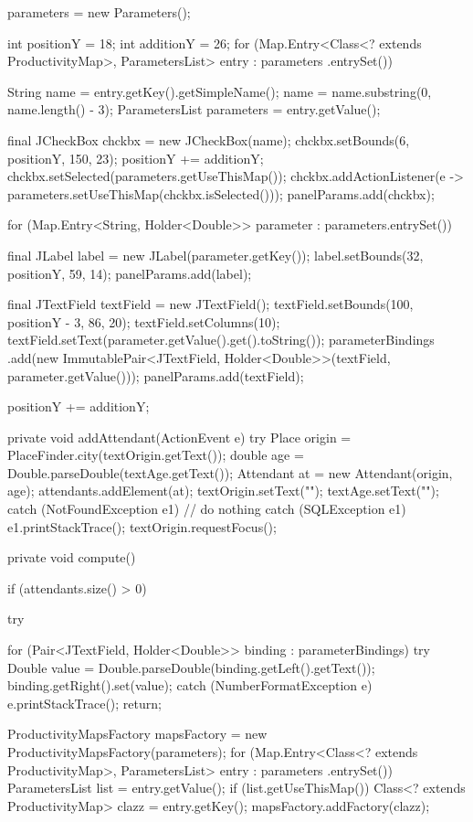 \begin{javacode}
{{    parameters = new Parameters();

    int positionY = 18;
    int additionY = 26;
    for (Map.Entry<Class<? extends ProductivityMap>, ParametersList> entry : parameters
        .entrySet()) {
      String name = entry.getKey().getSimpleName();
      name = name.substring(0, name.length() - 3);
      ParametersList parameters = entry.getValue();

      final JCheckBox chckbx = new JCheckBox(name);
      chckbx.setBounds(6, positionY, 150, 23);
      positionY += additionY;
      chckbx.setSelected(parameters.getUseThisMap());
      chckbx.addActionListener(e -> parameters.setUseThisMap(chckbx.isSelected()));
      panelParams.add(chckbx);

      for (Map.Entry<String, Holder<Double>> parameter : parameters.entrySet()) {
        final JLabel label = new JLabel(parameter.getKey());
        label.setBounds(32, positionY, 59, 14);
        panelParams.add(label);

        final JTextField textField = new JTextField();
        textField.setBounds(100, positionY - 3, 86, 20);
        textField.setColumns(10);
        textField.setText(parameter.getValue().get().toString());
        parameterBindings
            .add(new ImmutablePair<JTextField, Holder<Double>>(textField, parameter.getValue()));
        panelParams.add(textField);

        positionY += additionY;
      }
    }

  }

  private void addAttendant(ActionEvent e) {
    try {
      Place origin = PlaceFinder.city(textOrigin.getText());
      double age = Double.parseDouble(textAge.getText());
      Attendant at = new Attendant(origin, age);
      attendants.addElement(at);
      textOrigin.setText("");
      textAge.setText("");
    } catch (NotFoundException e1) {
      // do nothing
    } catch (SQLException e1) {
      e1.printStackTrace();
    }
    textOrigin.requestFocus();
  }

  private void compute() {
    if (attendants.size() > 0) {
      try {

        for (Pair<JTextField, Holder<Double>> binding : parameterBindings) {
          try {
            Double value = Double.parseDouble(binding.getLeft().getText());
            binding.getRight().set(value);
          } catch (NumberFormatException e) {
            e.printStackTrace();
            return;
          }
        }

        ProductivityMapsFactory mapsFactory = new ProductivityMapsFactory(parameters);
        for (Map.Entry<Class<? extends ProductivityMap>, ParametersList> entry : parameters
            .entrySet()) {
          ParametersList list = entry.getValue();
          if (list.getUseThisMap()) {
            Class<? extends ProductivityMap> clazz = entry.getKey();
            mapsFactory.addFactory(clazz);
          }
        }

}}}}
\end{javacode}
